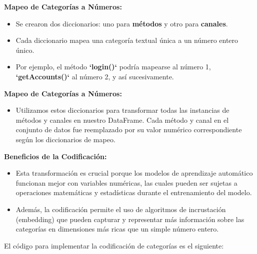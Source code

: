 \textbf{Mapeo de Categorías a Números:}

\begin{itemize}
    \item Se crearon dos diccionarios: uno para \textbf{métodos} y otro para \textbf{canales}.
    \item Cada diccionario mapea una categoría textual única a un número entero único.
    \item Por ejemplo, el método \textbf{`login()`} podría mapearse al número 1, \textbf{`getAccounts()`} al número 2, y así sucesivamente.
\end{itemize}

\textbf{Mapeo de Categorías a Números:}

\begin{itemize}
    \item Utilizamos estos diccionarios para transformar todas las instancias de métodos y canales en nuestro DataFrame. Cada método y canal en el conjunto de datos fue reemplazado por su valor numérico correspondiente según los diccionarios de mapeo.
\end{itemize}

\textbf{Beneficios de la Codificación:}

\begin{itemize}
    \item Esta transformación es crucial porque los modelos de aprendizaje automático funcionan mejor con variables numéricas, las cuales pueden ser sujetas a operaciones matemáticas y estadísticas durante el entrenamiento del modelo.
    \item Además, la codificación permite el uso de algoritmos de incrustación (embedding) que pueden capturar y representar más información sobre las categorías en dimensiones más ricas que un simple número entero.
\end{itemize}

El código para implementar la codificación de categorías es el siguiente:


